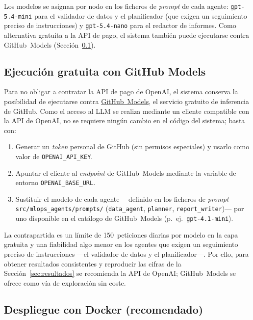 \noindent
Los modelos se asignan por nodo en los ficheros de \textit{prompt} de cada agente:
\texttt{gpt-5.4-mini} para el validador de datos y el planificador (que exigen un
seguimiento preciso de instrucciones) y \texttt{gpt-5.4-nano} para el redactor de
informes. Como alternativa gratuita a la API de pago, el sistema también puede
ejecutarse contra GitHub~Models (Sección~\ref{anexo:repro-github}).

\subsection{Ejecución gratuita con GitHub Models}
\label{anexo:repro-github}

Para no obligar a contratar la API de pago de OpenAI, el sistema conserva la posibilidad
de ejecutarse contra \href{https://github.com/marketplace/models}{GitHub~Models}, el
servicio gratuito de inferencia de GitHub. Como el acceso al LLM se realiza mediante un
cliente compatible con la API de OpenAI, no se requiere ningún cambio en el código del
sistema; basta con:

\begin{enumerate}
  \item Generar un \textit{token} personal de GitHub (sin permisos especiales) y usarlo
        como valor de \texttt{OPENAI\_API\_KEY}.
  \item Apuntar el cliente al \textit{endpoint} de GitHub~Models mediante la variable de
        entorno \texttt{OPENAI\_BASE\_URL}.
  \item Sustituir el modelo de cada agente —definido en los ficheros de \textit{prompt}
        \texttt{src/mlops\_agents/prompts/} (\texttt{data\_agent}, \texttt{planner},
        \texttt{report\_writer})— por uno disponible en el catálogo de GitHub~Models
        (p.~ej.\ \texttt{gpt-4.1-mini}).
\end{enumerate}

\noindent
La contrapartida es un límite de 150~peticiones diarias por modelo en la capa gratuita y
una fiabilidad algo menor en los agentes que exigen un seguimiento preciso de
instrucciones —el validador de datos y el planificador—. Por ello, para obtener
resultados consistentes y reproducir las cifras de la Sección~\ref{sec:resultados} se
recomienda la API de OpenAI; GitHub~Models se ofrece como vía de exploración sin coste.

\subsection{Despliegue con Docker (recomendado)}
\label{anexo:repro-docker}

